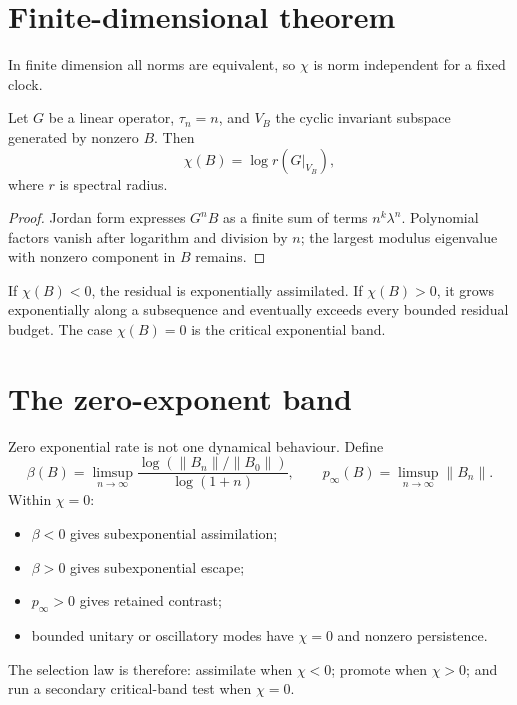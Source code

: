 \documentclass[11pt,a4paper]{article}
\begin{document}
\section{Finite-dimensional theorem}
In finite dimension all norms are equivalent, so $\chi$ is norm independent for a fixed clock.
\begin{theorem}
Let $G$ be a linear operator, $\tau_n=n$, and $V_B$ the cyclic invariant subspace generated by nonzero $B$. Then
\begin{equation}
\chi(B)=\log r(G|_{V_B}),
\end{equation}
where $r$ is spectral radius.
\end{theorem}
\begin{proof}
Jordan form expresses $G^nB$ as a finite sum of terms $n^k\lambda^n$. Polynomial factors vanish after logarithm and division by $n$; the largest modulus eigenvalue with nonzero component in $B$ remains.
\end{proof}

\begin{corollary}
If $\chi(B)<0$, the residual is exponentially assimilated. If $\chi(B)>0$, it grows exponentially along a subsequence and eventually exceeds every bounded residual budget. The case $\chi(B)=0$ is the critical exponential band.
\end{corollary}

\section{The zero-exponent band}
Zero exponential rate is not one dynamical behaviour. Define
\begin{equation}
\beta(B)=\limsup_{n\to\infty}
\frac{\log(\|B_n\|/\|B_0\|)}{\log(1+n)},
\qquad
p_\infty(B)=\limsup_{n\to\infty}\|B_n\|.
\end{equation}
Within $\chi=0$:
\begin{itemize}
\item $\beta<0$ gives subexponential assimilation;
\item $\beta>0$ gives subexponential escape;
\item $p_\infty>0$ gives retained contrast;
\item bounded unitary or oscillatory modes have $\chi=0$ and nonzero persistence.
\end{itemize}
The selection law is therefore: assimilate when $\chi<0$; promote when $\chi>0$; and run a secondary critical-band test when $\chi=0$.
\end{document}
